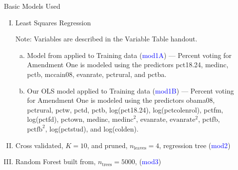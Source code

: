 \documentclass[final]{beamer}\usepackage[]{graphicx}\usepackage[]{color}
\begin{document}
\begin{frame}[fragile]
\begin{columns}[t]
\begin{column}{0.23\linewidth}
\begin{minipage}[t][.955\textheight]{\linewidth}
\begin{block}{Basic Models Used}

\begin{enumerate}[I.]
\item Least Squares Regression
\vspace{0ex}

Note: Variables are described in the Variable Table handout.
\begin{enumerate}[a.]
\item Model from \cite{DE12} applied to Training data (\textcolor{blue}{mod1A}) --- Percent voting for Amendment One is modeled using the predictors pct18.24, medinc, pctb, mccain08, evanrate, pctrural, and pctba. 
\item Our OLS model applied to Training data (\textcolor{blue}{mod1B}) --- Percent voting for Amendment One is modeled using the predictors obama08, pctrural, pctw, pctd, pctb, log(pct18.24), log(pctcolenrol), pctfm, log(pctfd), pctown,  medinc, $\text{medinc}^2$, evanrate, $\text{evanrate}^2$, pctfb, $\text{pctfb}^2$, log(pctstud), and log(colden).
\end{enumerate}
\item Cross validated, $K = 10$, and pruned, $n_{\text{leaves}}=4$, regression tree \cite{JF09} (\textcolor{blue}{mod2})
\item Random Forest built from, $n_{\text{trees}} = 5000 $, \cite{AL02} (\textcolor{blue}{mod3})
\end{enumerate}
\vspace{0ex}

\end{block}
\vfill

\end{minipage}
\end{column}%


\begin{column}{0.23\linewidth}
\begin{minipage}[t][.955\textheight]{\linewidth} 


\end{minipage}
\end{column}
\end{columns}
\end{frame}
\end{document}

